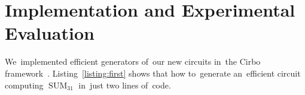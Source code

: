 \documentclass[sigconf, review, anonymous]{acmart}
\DeclareMathOperator{\SUM}{SUM}
\begin{document}
%
%
%
%
%
%
%
%
%

\section{Implementation and Experimental Evaluation}
We~implemented efficient generators of~our new circuits in~the Cirbo framework~\cite{DBLP:journals/corr/abs-2412-14933}. Listing~\ref{listing:first} shows
that how to~generate an~efficient circuit computing $\SUM_{31}$ in~just two lines of~code.
\end{document}
